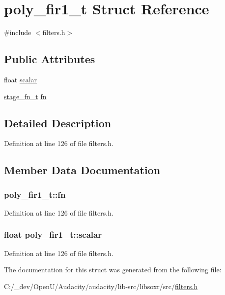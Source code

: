 \hypertarget{structpoly__fir1__t}{}\section{poly\+\_\+fir1\+\_\+t Struct Reference}
\label{structpoly__fir1__t}


{\ttfamily \#include $<$filters.\+h$>$}

\subsection*{Public Attributes}
\begin{DoxyCompactItemize}
\item 
float \hyperlink{structpoly__fir1__t_a81da13bf82053e72e0ec20a4430c97e5}{scalar}
\item 
\hyperlink{rate_8h_a59221c24235975480a4d5f8ff1e781e5}{stage\+\_\+fn\+\_\+t} \hyperlink{structpoly__fir1__t_a0a6650355d2ca26678854260c520f41f}{fn}
\end{DoxyCompactItemize}


\subsection{Detailed Description}


Definition at line 126 of file filters.\+h.



\subsection{Member Data Documentation}
\subsubsection[{\texorpdfstring{fn}{fn}}]{ poly\+\_\+fir1\+\_\+t\+::fn}\hypertarget{structpoly__fir1__t_a0a6650355d2ca26678854260c520f41f}{}\label{structpoly__fir1__t_a0a6650355d2ca26678854260c520f41f}


Definition at line 126 of file filters.\+h.

\subsubsection[{\texorpdfstring{scalar}{scalar}}]{\setlength{\rightskip}{0pt plus 5cm}float poly\+\_\+fir1\+\_\+t\+::scalar}\hypertarget{structpoly__fir1__t_a81da13bf82053e72e0ec20a4430c97e5}{}\label{structpoly__fir1__t_a81da13bf82053e72e0ec20a4430c97e5}


Definition at line 126 of file filters.\+h.



The documentation for this struct was generated from the following file\+:\begin{DoxyCompactItemize}
\item 
C\+:/\+\_\+dev/\+Open\+U/\+Audacity/audacity/lib-\/src/libsoxr/src/\hyperlink{filters_8h}{filters.\+h}\end{DoxyCompactItemize}
